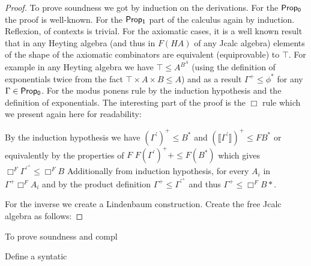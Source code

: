 			\begin{proof}
				To prove soundness we got by induction on the derivations. For the ${\sf Prop_0}$
				the proof is well-known. 
				For the ${\sf Prop_1}$ part of the calculus again by induction.
				Reflexion, of contexts is trivial. For the axiomatic cases, it is a well known result
				that in any Heyting algebra (and thus in $F(HA)$ of any Jcalc algebra) 
				elements of the shape of the axiomatic combinators are equivalent (equiprovable) to $\top$.
				For example in any Heyting algebra  we have $\top\le A^{B^A}$ 
				(using the definition of exponentials twice from the fact $\top\times A\times B\le A$) and as a result 
				$\Gamma^+\leq\phi^{*}$ for any $\Gamma\in {\sf Prop_0}$.
				For the modus ponens rule by the induction hypothesis and the definition of exponentials.
				The interesting part of the proof is the $\Box$ rule which we present again here for readability:
				\begin{mdframed}[nobreak=true, frametitle={\footnotesize Judgments on Necessity with $\Gamma\in {\sf Prop_1} \text{,{\ \sf length}}(\Gamma)=i\text{,\ }
					\ 1\le k\le i  \text{\ and, }\Gamma^{\prime},A, A_k,  B\in {\sf Prop_0}$ }]
				\mbox{\footnotesize
					\begin{mathpar}
						
						\inferrule*[right=$I_{\Box B}E^{\vec{x},\vec{s}}_{\Box A_1\ldots \Box A_i}$]{{(\forall  A_i \in \Gamma'. \ \Turn {\Gamma}{\Box  A_i})}\\{\Turn {\Gamma'} { B}}\\{\Turn {\llbracket \Gamma' \rrbracket} {\llbracket  B\rrbracket} }} {\Turn {\Gamma}\Box  B}

					\end{mathpar}}
				\end{mdframed}
				
				By the induction hypothesis we have $(\Gamma^{'})^{+}\le B^{*}$
				and $(\llbracket\Gamma^{'}\rrbracket)^{+}\le FB^{*}$ or equivalently by the properties of $F$
				$F(\Gamma^{'})^{+}+\le F(B^{*})$ which gives $\Box^F{\Gamma^{'}^{+}}\le \Box^F B$
				Additionally from induction hypothesis, for every $A_i$ in $\Gamma^{+}\Box^F A_i$
				and by the product definition $\Gamma^{+}\le\Gamma^{'}^{+}$ and thus
				$\Gamma^{+}\le\Box^F B*$.

				For the inverse we create a Lindenbaum construction. Create the free Jcalc algebra
				as follows: 


			\end{proof}
			To prove soundness and compl
			\begin{theorem}
				Define a syntatic
			\end{theorem}
		\begin{theorem}
		\end{theorem}
